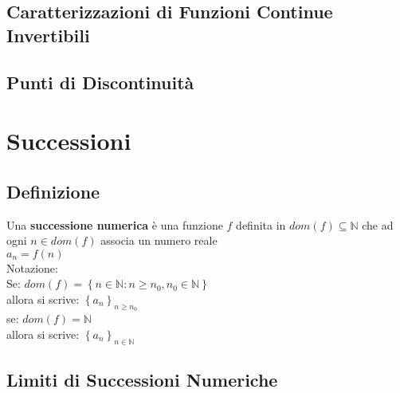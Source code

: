 \documentclass[a4paper, twoside, italian, 11pt]{book}
\newcommand{\braces}[1] {\left \{ #1 \right \}}
\newcommand{\N}{\mathbb{N}}
\begin{document}



\section{Caratterizzazioni di Funzioni Continue Invertibili}




\section{Punti di Discontinuità}




\chapter{Successioni}



\section{Definizione}

\noindent
Una \textbf{successione numerica} è una funzione $f$ definita in $dom(f) \subseteq \N$ che ad ogni $n \in dom(f)$ associa un numero reale \\

$a_n = f(n)$ \\

\noindent
Notazione: \\

Se: $dom(f) = \braces{n \in \N : n \geq n_0, n_0 \in \N}$ \\

allora si scrive: $\braces{a_n}_{n \geq n_0}$ \\

se: $dom(f) = \N$ \\

allora si scrive: $\braces{a_n}_{n \in \N}$ \\




\section{Limiti di Successioni Numeriche}

\end{document}
